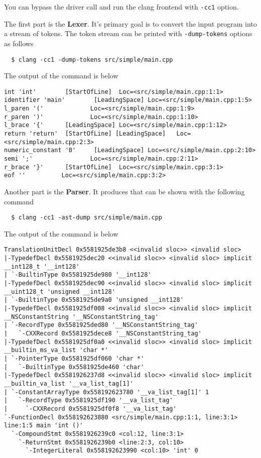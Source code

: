 You can bypass the driver call and run the clang frontend  with
\texttt{-cc1} option. 

The first part is the \textbf{Lexer}. It's primary goal is to convert the input
program into a stream of tokens. The token stream can be printed with
\texttt{-dump-tokens} options as follows
\begin{verbatim}
  $ clang -cc1 -dump-tokens src/simple/main.cpp
\end{verbatim}
The output of the command is below
\begin{verbatim}
int 'int'        [StartOfLine]  Loc=<src/simple/main.cpp:1:1>
identifier 'main'        [LeadingSpace] Loc=<src/simple/main.cpp:1:5>
l_paren '('             Loc=<src/simple/main.cpp:1:9>
r_paren ')'             Loc=<src/simple/main.cpp:1:10>
l_brace '{'      [LeadingSpace] Loc=<src/simple/main.cpp:1:12>
return 'return'  [StartOfLine] [LeadingSpace]   Loc=<src/simple/main.cpp:2:3>
numeric_constant '0'     [LeadingSpace] Loc=<src/simple/main.cpp:2:10>
semi ';'                Loc=<src/simple/main.cpp:2:11>
r_brace '}'      [StartOfLine]  Loc=<src/simple/main.cpp:3:1>
eof ''          Loc=<src/simple/main.cpp:3:2>
\end{verbatim}

Another part is the \textbf{Parser}. It produces  that
can be shown with the following command
\begin{verbatim}
  $ clang -cc1 -ast-dump src/simple/main.cpp
  \end{verbatim}
The output of the command is below
\begin{verbatim}
TranslationUnitDecl 0x5581925de3b8 <<invalid sloc>> <invalid sloc>
|-TypedefDecl 0x5581925dec20 <<invalid sloc>> <invalid sloc> implicit __int128_t '__int128'
| `-BuiltinType 0x5581925de980 '__int128'
|-TypedefDecl 0x5581925dec90 <<invalid sloc>> <invalid sloc> implicit __uint128_t 'unsigned __int128'
| `-BuiltinType 0x5581925de9a0 'unsigned __int128'
|-TypedefDecl 0x5581925df008 <<invalid sloc>> <invalid sloc> implicit __NSConstantString '__NSConstantString_tag'
| `-RecordType 0x5581925ded80 '__NSConstantString_tag'
|   `-CXXRecord 0x5581925dece8 '__NSConstantString_tag'
|-TypedefDecl 0x5581925df0a0 <<invalid sloc>> <invalid sloc> implicit __builtin_ms_va_list 'char *'
| `-PointerType 0x5581925df060 'char *'
|   `-BuiltinType 0x5581925de460 'char'
|-TypedefDecl 0x5581926237d8 <<invalid sloc>> <invalid sloc> implicit __builtin_va_list '__va_list_tag[1]'
| `-ConstantArrayType 0x558192623780 '__va_list_tag[1]' 1
|   `-RecordType 0x5581925df190 '__va_list_tag'
|     `-CXXRecord 0x5581925df0f8 '__va_list_tag'
`-FunctionDecl 0x558192623880 <src/simple/main.cpp:1:1, line:3:1> line:1:5 main 'int ()'
  `-CompoundStmt 0x5581926239c0 <col:12, line:3:1>
    `-ReturnStmt 0x5581926239b0 <line:2:3, col:10>
      `-IntegerLiteral 0x558192623990 <col:10> 'int' 0
\end{verbatim}

